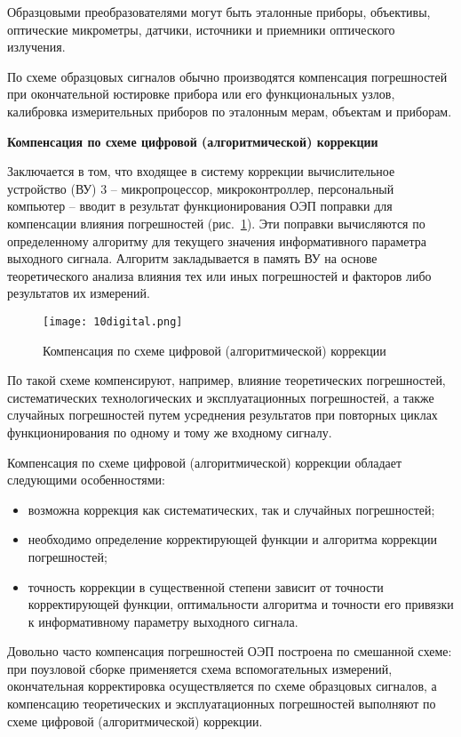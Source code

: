 Образцовыми преобразователями могут быть эталонные приборы, объективы, оптические микрометры, датчики, источники и приемники оптического излучения.

По схеме образцовых сигналов обычно производятся компенсация погрешностей при окончательной юстировке прибора или его функциональных узлов, калибровка измерительных приборов по эталонным мерам, объектам и приборам. 

\begin{flushleft}
	\textbf{Компенсация по схеме цифровой (алгоритмической) коррекции}
\end{flushleft}

Заключается в том, что входящее в систему коррекции вычислительное устройство (ВУ) 3 -- микропроцессор, микроконтроллер, персональный компьютер -- вводит в результат функционирования ОЭП поправки для компенсации влияния погрешностей (рис.~\ref{pic:10digital}). Эти поправки вычисляются по определенному алгоритму для текущего значения информативного параметра выходного сигнала. Алгоритм закладывается в память ВУ на основе теоретического анализа влияния тех или иных погрешностей и факторов либо результатов их измерений.

\begin{figure}[h!]
	\caption{ Компенсация по схеме цифровой (алгоритмической) коррекции }
	\texttt{[image: 10digital.png]}
	\label{pic:10digital}
\end{figure}

По такой схеме компенсируют, например, влияние теоретических погрешностей, систематических технологических и эксплуатационных погрешностей, а также случайных погрешностей путем усреднения результатов при повторных циклах функционирования по одному и тому же входному сигналу. 

Компенсация по схеме цифровой (алгоритмической) коррекции обладает следующими особенностями:
\begin{itemize}
\item возможна коррекция как систематических, так и случайных погрешностей;
\item необходимо определение корректирующей функции и алгоритма коррекции погрешностей;
\item точность коррекции в существенной степени зависит от точности корректирующей функции, оптимальности алгоритма и точности его привязки к информативному параметру выходного сигнала.
\end{itemize}

Довольно часто компенсация погрешностей ОЭП построена по смешанной схеме: при поузловой сборке применяется схема вспомогательных измерений, окончательная корректировка осуществляется по схеме образцовых сигналов, а компенсацию теоретических и эксплуатационных погрешностей выполняют по схеме цифровой (алгоритмической) коррекции.

